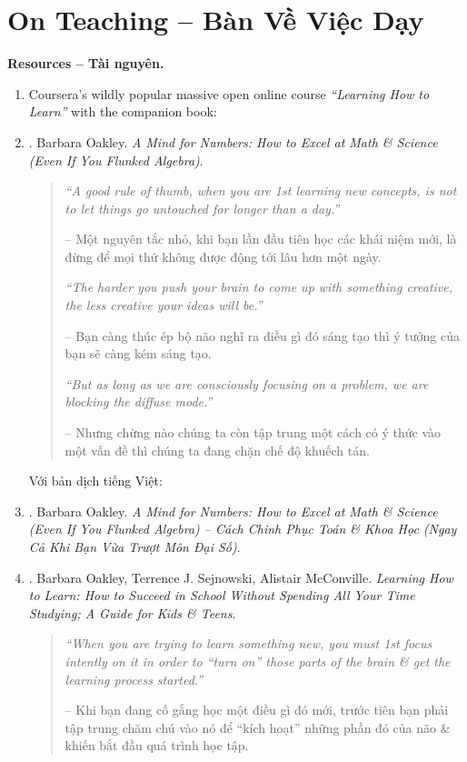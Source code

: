 \documentclass[12pt]{article}
\begin{document}
\section{On Teaching -- Bàn Về Việc Dạy}
\label{sect: teaching}
\textbf{\textsf{Resources -- Tài nguyên.}}
\begin{enumerate}
	\item {\sc Coursera}'s wildly popular massive open online course {\it``Learning How to Learn''} with the companion book:	
	\item \cite{Oakley_mind_number}. {\sc Barbara Oakley}. {\it A Mind for Numbers: How to Excel at Math \& Science (Even If You Flunked Algebra)}.
	\begin{quotation}
		{\it``A good rule of thumb, when you are 1st learning new concepts, is not to let things go untouched for longer than a day.''}
		
		-- Một nguyên tắc nhỏ, khi bạn lần đầu tiên học các khái niệm mới, là đừng để mọi thứ không được động tới lâu hơn một ngày.
		
		{\it``The harder you push your brain to come up with something creative, the less creative your ideas will be.''}
		
		-- Bạn càng thúc ép bộ não nghĩ ra điều gì đó sáng tạo thì ý tưởng của bạn sẽ càng kém sáng tạo.
		
		{\it``But as long as we are consciously focusing on a problem, we are blocking the diffuse mode.''}
		
		-- Nhưng chừng nào chúng ta còn tập trung một cách có ý thức vào một vấn đề thì chúng ta đang chặn chế độ khuếch tán.
	\end{quotation}
	Với bản dịch tiếng Việt:
	\item \cite{Oakley_mind_number_VN}. {\sc Barbara Oakley}. {\it A Mind for Numbers: How to Excel at Math \& Science (Even If You Flunked Algebra) -- Cách Chinh Phục Toán \& Khoa Học (Ngay Cả Khi Bạn Vừa Trượt Môn Đại Số)}.
	\item \cite{Oakley_Sejnowski_McConville_learn_how_learn}. {\sc Barbara Oakley, Terrence J. Sejnowski, Alistair McConville}. {\it Learning How to Learn: How to Succeed in School Without Spending All Your Time Studying; A Guide for Kids \& Teens}.
	\begin{quotation}
		{\it``When you are trying to learn something new, you must 1st focus intently on it in order to ``turn on'' those parts of the brain \& get the learning process started.''}
		
		-- Khi bạn đang cố gắng học một điều gì đó mới, trước tiên bạn phải tập trung chăm chú vào nó để ``kích hoạt'' những phần đó của não \& khiến bắt đầu quá trình học tập.
		

\end{quotation}
\end{enumerate}
\end{document}
